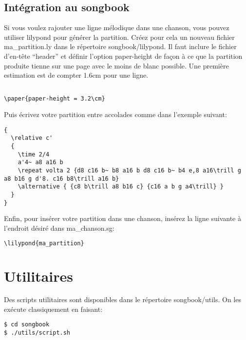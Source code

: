 \documentclass[a4paper]{article}
\begin{document}
\subsection{Intégration au songbook}

Si vous voulez rajouter une ligne mélodique dans une chanson, vous
pouvez utiliser lilypond pour générer la partition. Créez pour cela un
nouveau fichier ma\_partition.ly dans le répertoire songbook/lilypond.
Il faut inclure le fichier d'en-tête ``header'' et définir l'option
paper-height de façon à ce que la partition produite tienne sur une
page avec le moins de blanc possible. Une première estimation est de
compter 1.6cm pour une ligne.

\begin{verbatim}

\paper{paper-height = 3.2\cm}
\end{verbatim}

Puis écrivez votre partition entre accolades comme dans l'exemple
suivant:

\begin{verbatim}
{
  \relative c'
  {
    \time 2/4
    a'4~ a8 a16 b
    \repeat volta 2 {d8 c16 b~ b8 a16 b d8 c16 b~ b4 e,8 a16\trill g a8 b16 g d'8. c16 b8\trill a16 b}
    \alternative { {c8 b\trill a8 b16 c} {c16 a b g a4\trill} }
  }
}
\end{verbatim}

Enfin, pour insérer votre partition dans une chanson, insérez la ligne
suivante à l'endroit désiré dans ma\_chanson.sg:

\begin{verbatim}
\lilypond{ma_partition}
\end{verbatim}


\section{Utilitaires}\label{sect:utilitaires}

Des scripts utilitaires sont disponibles dans le répertoire
songbook/utils. On les exécute classiquement en faisant:

\begin{verbatim}
$ cd songbook
$ ./utils/script.sh
\end{verbatim}
\end{document}
